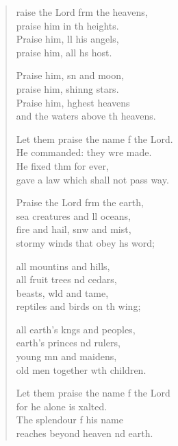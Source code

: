 \settowidth{\versewidth}{Let them praise the name of the Lord. *}
\begin{verse}%
  \begin{patverse}
raise the Lord frm the heavens,\Med\\
    praise him in th heights.\\
Praise him, ll his angels,\Med\\
    praise him, all h\pointup{\i}s host.

Praise him, sn and moon,\Med\\
    praise him, shin\pointup{\i}ng stars.\\
Praise him, h\pointup{\i}ghest heavens\Med\\
    and the waters above th heavens.

Let them praise the name f the Lord.\Med\\
    He commanded: they wre made.\\
He fixed thm for ever,\Med\\
    gave a law which shall not pass way.

Praise the Lord frm the earth,\Med\\
    sea creatures and ll oceans,\\
fire and hail, snw and mist,\Med\\
    stormy winds that obey h\pointup{\i}s word;

all mountins and hills,\Med\\
    all fruit trees nd cedars,\\
beasts, w\pointup{\i}ld and tame,\Med\\
    reptiles and birds on th wing;

all earth’s k\pointup{\i}ngs and peoples,\Med\\
    earth’s princes nd rulers,\\
young mn and maidens,\Med\\
    old men together w\pointup{\i}th children.

Let them praise the name f the Lord\Med\\
    for he alone is xalted.\\
The splendour f his name\Med\\
    reaches beyond heaven nd earth.


\end{patverse}
\end{verse}
